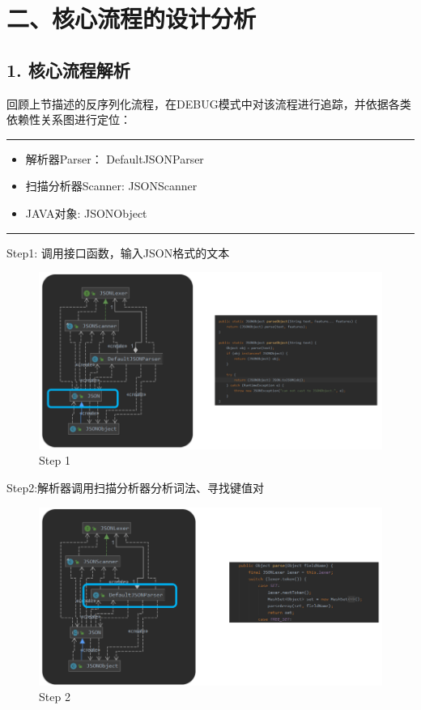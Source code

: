 \documentclass{article}
\begin{document}
\section*{\Large 二、核心流程的设计分析}
\subsection*{1. 核心流程解析}
回顾上节描述的反序列化流程，在DEBUG模式中对该流程进行追踪，并依据各类依赖性关系图进行定位：\\
\rule{\textwidth}{0.7mm}
\begin{itemize}
\item 解析器Parser：		DefaultJSONParser
\item 扫描分析器Scanner:    JSONScanner
\item JAVA对象:			    JSONObject
\end{itemize}
\rule{\textwidth}{0.7mm}

Step1: 调用接口函数，输入JSON格式的文本
\begin{figure}[H]
\centering %
\includegraphics[width = 14cm]{pic9.png}
\caption{Step 1}
\end{figure}

Step2:解析器调用扫描分析器分析词法、寻找键值对
\begin{figure}[H]
\centering %
\includegraphics[width = 14cm]{pic10.png}
\caption{Step 2}
\end{figure}
\end{document}
